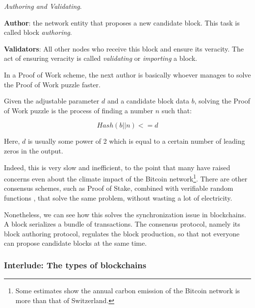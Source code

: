 \begin{definition} \label{def:auhtor_validator}

	\textit{Authoring and Validating}.

	\textbf{Author}: the network entity that proposes a new candidate block. This task is called
	block \textit{authoring}.

	\textbf{Validators}: All other nodes who receive this block and ensure its veracity. The act of
	ensuring veracity is called \textit{validating} or \textit{importing} a block.
\end{definition}

In a Proof of Work scheme, the next author is basically whoever manages to solve the Proof of Work
puzzle faster.

\begin{definition} \label{def:pow} Given the adjustable parameter $d$ and a candidate block data
$b$, solving the Proof of Work puzzle is the process of finding a number $n$ such that:

	\begin{equation}
		Hash(b || n) <= d
	\end{equation}

Here, $d$ is usually some power of 2 which is equal to a certain number of leading zeros in the
output.
\end{definition}

Indeed, this is very slow and inefficient, to the point that many have raised concerns even about
the climate impact of the Bitcoin network\footnote{Some estimates show the annual carbon emission of
the Bitcoin network is more than that of Switzerland\cite{stollCarbonFootprintBitcoin2019}.}. There
are other consensus schemes, such as Proof of Stake, combined with verifiable random
functions \cite{dodisVerifiableRandomFunction2005}, that solve the same problem, without wasting a
lot of electricity.

Nonetheless, we can see how this solves the synchronization issue in blockchains. A block serializes
a bundle of transactions. The consensus protocol, namely its block authoring protocol, regulates the
block production, so that not everyone can propose candidate blocks at the same time.

\subsubsection{Interlude: The types of blockchains} \label{chap_bg:subsec:blockchain_types}

